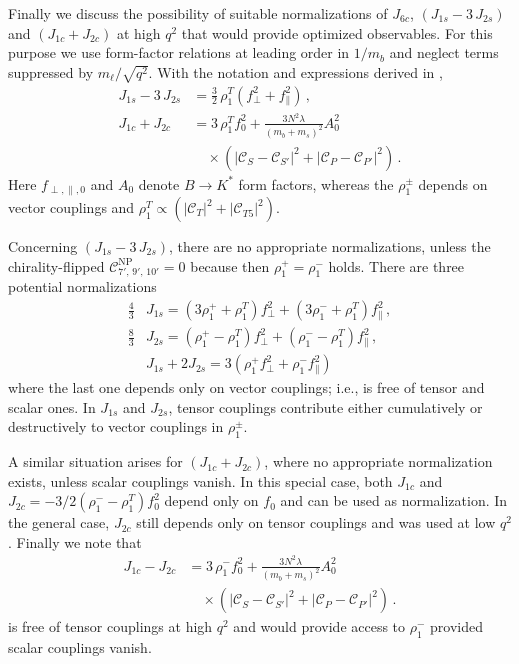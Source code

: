 \documentclass[twocolumn,epjc3]{svjour3}
\numberwithin{equation}{section}
\newcommand{\todo}[1]{{\color{magenta}{ {\bf ToDo: }{#1}}}}
\newcommand{\wilson}[2][{}]{\mathcal{C}_{#2}^{\mathrm{#1}}}
\renewcommand{\[}{\big[}
\renewcommand{\]}{\big]}
\renewcommand{\(}{\big(}
\renewcommand{\)}{\big)}
\begin{document}
Finally we discuss the possibility of suitable normalizations of $J_{6c}$,
$(J_{1s} - 3\, J_{2s})$ and $(J_{1c} + J_{2c})$ at high $q^2$ that would provide
optimized observables. For this purpose we use form-factor relations at leading
order in $1/m_b$ and neglect terms suppressed by $m_\ell/\sqrt{q^2}$. With the
notation and expressions derived in \cite{Bobeth:2012vn},
\begin{equation}
\begin{aligned}
  J_{1s} - 3\, J_{2s} & = \frac{3}{2}\, \rho_1^T (f_\perp^2 + f_\parallel^2) \,,
\\[0.1cm]
  J_{1c} + J_{2c} & = 3\, \rho_1^T f_0^2
     + \frac{3 N^2 \lambda}{(m_b+m_s)^2} A_0^2
\\
   & \quad \times \left(|\wilson{S}-\wilson{S'}|^2 + |\wilson{P}-\wilson{P'}|^2\right)\,.
\end{aligned}
\end{equation}
Here $f_{\perp, \parallel, 0}$ and $A_0$ denote $B\to K^*$ form factors, whereas
the $\rho_1^\pm$ depends on vector couplings and $\rho_1^T \propto
(|\wilson{T}|^2 + |\wilson{T5}|^2)$.

Concerning $(J_{1s} - 3\, J_{2s})$, there are no appropriate normalizations,
unless the chirality-flipped $\wilson[NP]{7',\,9',\,10'} = 0$ because then
$\rho_1^+ = \rho_1^-$ holds. There are three potential normalizations
\begin{equation}
\begin{aligned}
  \frac{4}{3} & J_{1s} =
    (3 \rho_1^+ + \rho_1^T) f_\perp^2 +  (3 \rho_1^- + \rho_1^T) f_\parallel^2 \,,
\\
  \frac{8}{3} & J_{2s} =
    (\rho_1^+ - \rho_1^T) f_\perp^2 +
    (\rho_1^- - \rho_1^T) f_\parallel^2 \,,
\\[0.1cm]
  & J_{1s} + 2 J_{2s} =
    3 (\rho_1^+ f_\perp^2 + \rho_1^- f_\parallel^2) \,
\end{aligned}
\end{equation}
where the last one depends only on vector couplings; i.e., is free of tensor and
scalar ones. In $J_{1s}$ and $J_{2s}$, tensor couplings contribute either
cumulatively or destructively to vector couplings in $\rho_1^\pm$.

A similar situation arises for $(J_{1c} + J_{2c})$, where no appropriate
normalization exists, unless scalar couplings vanish. In this special case, both
$J_{1c}$ and $J_{2c} = -3/2 (\rho_1^- - \rho_1^T) f_0^2$ depend only on $f_0$
and can be used as normalization. In the general case, $J_{2c}$ still depends
only on tensor couplings and was used at low $q^2$ \cite{Matias:2012xw}. Finally
we note that
\begin{equation}
\begin{aligned}
  J_{1c} - J_{2c} & = 3\,\rho_1^- f_0^2 + \frac{3 N^2 \lambda}{(m_b+m_s)^2} A_0^2
\\
   & \quad \times \left(|\wilson{S}-\wilson{S'}|^2 + |\wilson{P}-\wilson{P'}|^2\right)\,.
\end{aligned}
\end{equation}
is free of tensor couplings at high $q^2$ and would provide access to
$\rho_1^-$ provided scalar couplings vanish.
\end{document}

